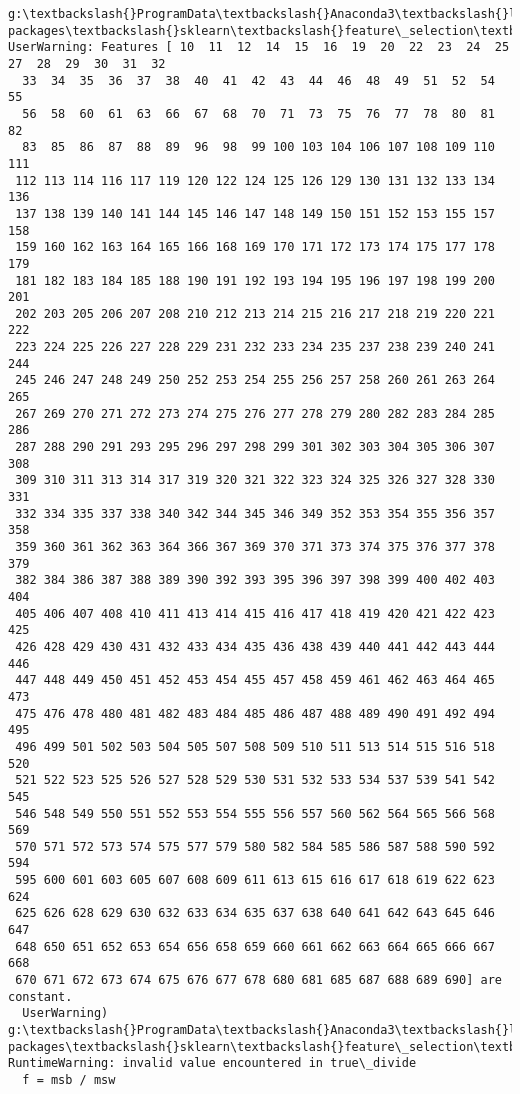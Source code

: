 \documentclass[11pt]{article}
\begin{document}
    \begin{Verbatim}[commandchars=\\\{\}]
g:\textbackslash{}ProgramData\textbackslash{}Anaconda3\textbackslash{}lib\textbackslash{}site-packages\textbackslash{}sklearn\textbackslash{}feature\_selection\textbackslash{}univariate\_selection.py:114: UserWarning: Features [ 10  11  12  14  15  16  19  20  22  23  24  25  27  28  29  30  31  32
  33  34  35  36  37  38  40  41  42  43  44  46  48  49  51  52  54  55
  56  58  60  61  63  66  67  68  70  71  73  75  76  77  78  80  81  82
  83  85  86  87  88  89  96  98  99 100 103 104 106 107 108 109 110 111
 112 113 114 116 117 119 120 122 124 125 126 129 130 131 132 133 134 136
 137 138 139 140 141 144 145 146 147 148 149 150 151 152 153 155 157 158
 159 160 162 163 164 165 166 168 169 170 171 172 173 174 175 177 178 179
 181 182 183 184 185 188 190 191 192 193 194 195 196 197 198 199 200 201
 202 203 205 206 207 208 210 212 213 214 215 216 217 218 219 220 221 222
 223 224 225 226 227 228 229 231 232 233 234 235 237 238 239 240 241 244
 245 246 247 248 249 250 252 253 254 255 256 257 258 260 261 263 264 265
 267 269 270 271 272 273 274 275 276 277 278 279 280 282 283 284 285 286
 287 288 290 291 293 295 296 297 298 299 301 302 303 304 305 306 307 308
 309 310 311 313 314 317 319 320 321 322 323 324 325 326 327 328 330 331
 332 334 335 337 338 340 342 344 345 346 349 352 353 354 355 356 357 358
 359 360 361 362 363 364 366 367 369 370 371 373 374 375 376 377 378 379
 382 384 386 387 388 389 390 392 393 395 396 397 398 399 400 402 403 404
 405 406 407 408 410 411 413 414 415 416 417 418 419 420 421 422 423 425
 426 428 429 430 431 432 433 434 435 436 438 439 440 441 442 443 444 446
 447 448 449 450 451 452 453 454 455 457 458 459 461 462 463 464 465 473
 475 476 478 480 481 482 483 484 485 486 487 488 489 490 491 492 494 495
 496 499 501 502 503 504 505 507 508 509 510 511 513 514 515 516 518 520
 521 522 523 525 526 527 528 529 530 531 532 533 534 537 539 541 542 545
 546 548 549 550 551 552 553 554 555 556 557 560 562 564 565 566 568 569
 570 571 572 573 574 575 577 579 580 582 584 585 586 587 588 590 592 594
 595 600 601 603 605 607 608 609 611 613 615 616 617 618 619 622 623 624
 625 626 628 629 630 632 633 634 635 637 638 640 641 642 643 645 646 647
 648 650 651 652 653 654 656 658 659 660 661 662 663 664 665 666 667 668
 670 671 672 673 674 675 676 677 678 680 681 685 687 688 689 690] are constant.
  UserWarning)
g:\textbackslash{}ProgramData\textbackslash{}Anaconda3\textbackslash{}lib\textbackslash{}site-packages\textbackslash{}sklearn\textbackslash{}feature\_selection\textbackslash{}univariate\_selection.py:115: RuntimeWarning: invalid value encountered in true\_divide
  f = msb / msw

    \end{Verbatim}
\end{document}
